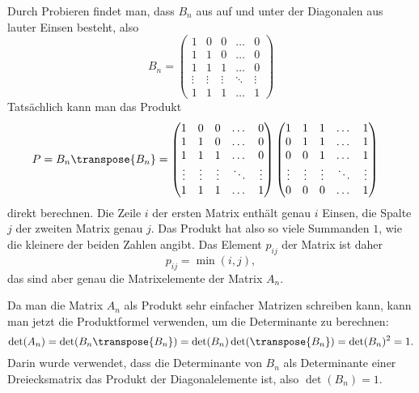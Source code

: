 \begin{loesung}
Durch Probieren findet man, dass $B_n$ aus auf und unter der Diagonalen aus
lauter Einsen besteht, also
\[
B_n
=
\begin{pmatrix}
     1&     0&     0&\dots &     0\\
     1&     1&     0&\dots &     0\\
     1&     1&     1&\dots &     0\\
\vdots&\vdots&\vdots&\ddots&\vdots\\
     1&     1&     1&\dots &     1
\end{pmatrix}
\]
Tatsächlich kann man das Produkt
\begin{align*}
P=B_n\transpose{B_n}
&=
\begin{pmatrix}
     1&     0&     0&\dots &     0\\
     1&     1&     0&\dots &     0\\
     1&     1&     1&\dots &     0\\
\vdots&\vdots&\vdots&\ddots&\vdots\\
     1&     1&     1&\dots &     1
\end{pmatrix}
\begin{pmatrix}
     1&     1&     1&\dots &     1\\
     0&     1&     1&\dots &     1\\
     0&     0&     1&\dots &     1\\
\vdots&\vdots&\vdots&\ddots&\vdots\\
     0&     0&     0&\dots &     1
\end{pmatrix}
\end{align*}
direkt berechnen.
Die Zeile $i$ der ersten Matrix enthält genau $i$ Einsen, die Spalte $j$ 
der zweiten Matrix genau $j$.
Das Produkt hat also so viele Summanden $1$, wie die kleinere der beiden
Zahlen angibt.
Das Element $p_{ij}$ der Matrix ist daher
\[
p_{ij}=\min(i,j),
\]
das sind aber genau die Matrixelemente der Matrix $A_n$.

Da man die Matrix $A_n$ als Produkt sehr einfacher Matrizen schreiben kann,
kann man jetzt die Produktformel verwenden, um die Determinante zu berechnen:
\[
\det(A_n)
=
\det(B_n\transpose{B_n})=\det(B_n)\det(\transpose{B_n})
=
\det(B_n)^2=1.
\]
Darin wurde verwendet, dass die Determinante von $B_n$ als Determinante
einer Dreiecksmatrix das Produkt der Diagonalelemente ist, also
$\det(B_n)=1$. 
\end{loesung}

